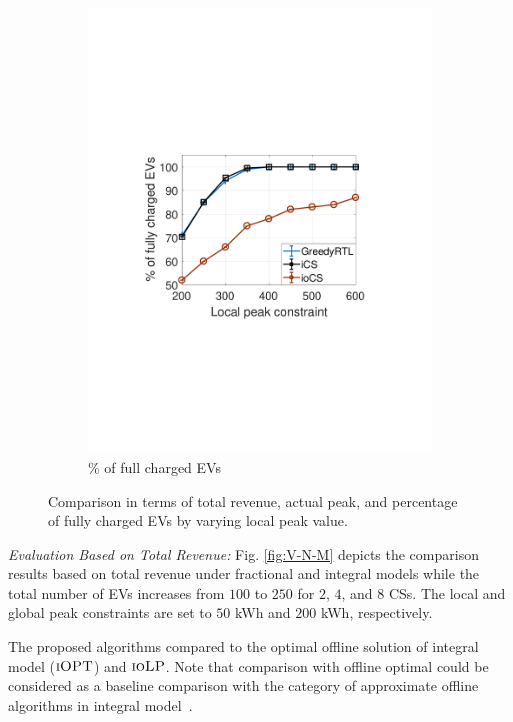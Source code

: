 \documentclass[journal]{IEEEtran}
\newcommand{\bt}[1]{{\color{blue}#1}}%
\newcommand{\revv}[1]{{\color{black}#1}}%
\newcommand{\bt}[1]{#1}
\newcommand{\iolp}{\textsc{ioLP}\xspace}
\begin{document}
\begin{figure}[t!]
\begin{subfigure}[b]{0.25\textwidth}
\begin{center}
						\includegraphics[width=\textwidth]{acc-c.pdf}
						\caption{\revv{\% of full charged EVs}}
						\label{fig:acc-c}
					\end{center}
				\end{subfigure}%
				\caption{\revv{Comparison in terms of total revenue, actual peak, and percentage of fully charged EVs by varying local peak value}.} 
				\label{fig:peak_local}
			\end{figure}
\textit{\revv{Evaluation Based on Total Revenue}:}
\revv{Fig. \ref{fig:V-N-M} depicts the comparison results based on total revenue under fractional and integral models} while the total number of EVs increases from \revv{$100$ to $250$} for $2$, $4$, and $8$ CSs. \revv{The local and global peak constraints are set to $50$ kWh and $200$ kWh, respectively.}

The proposed algorithms compared to the optimal offline solution of integral model ($\textsc{iOPT}$) and $\iolp$. \bt{Note that comparison with offline optimal could be considered as a baseline comparison with the category of approximate offline algorithms in integral model~\cite{yao2016real}.}
\end{document}
